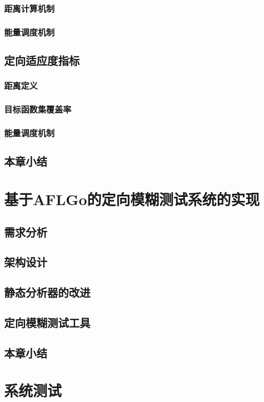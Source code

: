 \documentclass[bachelor]{njupthesis}
\begin{document}
\subsection{距离计算机制}
\subsection{能量调度机制}
\section{定向适应度指标}
\subsection{距离定义}
\subsection{目标函数集覆盖率}
\subsection{能量调度机制}
\section{本章小结}


\chapter{基于AFLGo的定向模糊测试系统的实现}
\section{需求分析}
\section{架构设计}
\section{静态分析器的改进}
\section{定向模糊测试工具}
\section{本章小结}

\chapter{系统测试}
\end{document}
